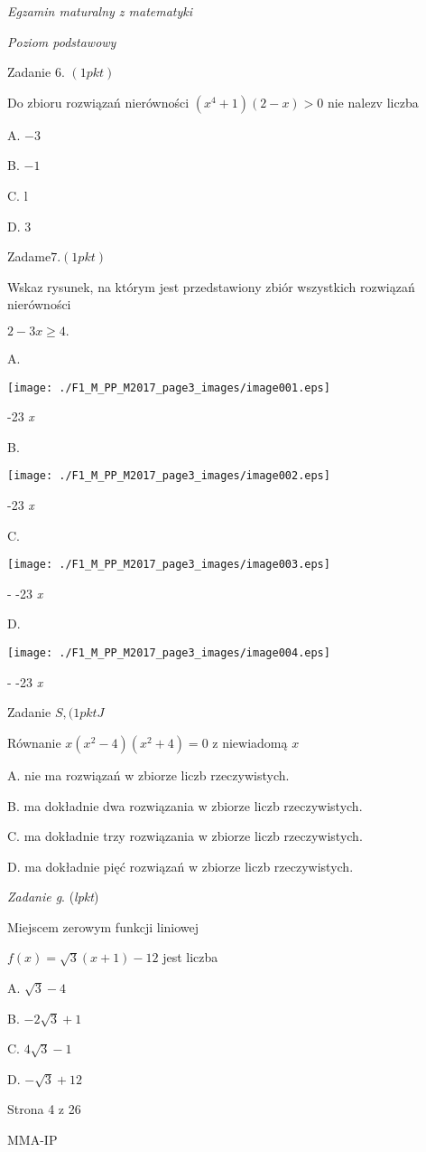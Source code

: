 \documentclass[a4paper,12pt]{article}
\begin{document}
{\it Egzamin maturalny z matematyki}

{\it Poziom podstawowy}

Zadanie 6. $(1pkt)$

Do zbioru rozwiązań nierówności $(x^{4}+1)(2-x)>0$ nie nalez$\mathrm{v}$ liczba

A. $-3$

B. $-1$

C. l

D. 3

Zadam$\mathrm{e}7. (1pkt)$

Wskaz rysunek, na którym jest przedstawiony zbiór wszystkich rozwiązań nierówności

$2-3x\geq 4.$

A.
\begin{center}
\texttt{[image: ./F1\_M\_PP\_M2017\_page3\_images/image001.eps]}
\end{center}
-23  {\it x}

B.
\begin{center}
\texttt{[image: ./F1\_M\_PP\_M2017\_page3\_images/image002.eps]}
\end{center}
-23  {\it x}

C.
\begin{center}
\texttt{[image: ./F1\_M\_PP\_M2017\_page3\_images/image003.eps]}
\end{center}
- -23  {\it x}

D.
\begin{center}
\texttt{[image: ./F1\_M\_PP\_M2017\_page3\_images/image004.eps]}
\end{center}
- -23  {\it x}

Zadanie $S, (1pktJ$

Równanie $x(x^{2}-4)(x^{2}+4)=0$ z niewiadomą $x$

A. nie ma rozwiązań w zbiorze liczb rzeczywistych.

B. ma dokładnie dwa rozwiązania w zbiorze liczb rzeczywistych.

C. ma dokładnie trzy rozwiązania w zbiorze liczb rzeczywistych.

D. ma dokładnie pięć rozwiązań w zbiorze liczb rzeczywistych.

{\it Zadanie g}. ({\it lpkt})

Miejscem zerowym funkcji liniowej

$f(x)=\sqrt{3}(x+1)-12$ jest liczba

A. $\sqrt{3}-4$

B. $-2\sqrt{3}+1$

C. $4\sqrt{3}-1$

D. $-\sqrt{3}+12$

Strona 4 z 26

MMA-IP
\end{document}
